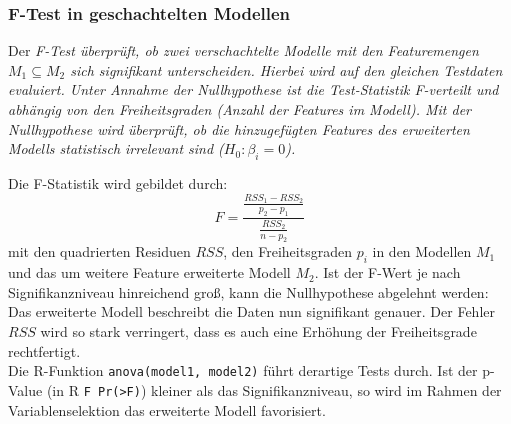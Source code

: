 \subsubsection{F-Test in geschachtelten Modellen}
Der \it{F-Test} überprüft, ob zwei verschachtelte Modelle mit den Featuremengen $M_1 \subseteq M_2$ sich signifikant unterscheiden.
Hierbei wird auf den gleichen Testdaten evaluiert.
Unter Annahme der Nullhypothese ist die Test-Statistik F-verteilt und abhängig von den Freiheitsgraden (Anzahl der Features im Modell).
Mit der Nullhypothese wird überprüft, ob die hinzugefügten Features des erweiterten Modells statistisch irrelevant sind ($H_0: \beta_i = 0$).

Die F-Statistik wird gebildet durch:
\begin{equation}
	F=\frac{\frac{RSS_1-RSS_2}{p_2-p_1}}{\frac{RSS_2}{n-p_2}}
\end{equation}
mit den quadrierten Residuen $RSS$, den Freiheitsgraden $p_i$ in den Modellen $M_1$ und das um weitere Feature erweiterte Modell $M_2$.
Ist der F-Wert je nach Signifikanzniveau hinreichend groß, kann die Nullhypothese abgelehnt werden:
Das erweiterte Modell beschreibt die Daten nun signifikant genauer.
Der Fehler $RSS$ wird so stark verringert, dass es auch eine Erhöhung der Freiheitsgrade rechtfertigt. 
\\
Die R-Funktion \lstinline|anova(model1, model2)| führt derartige Tests durch. Ist der p-Value (in R \lstinline|F Pr(>F)|) kleiner als das Signifikanzniveau, so wird im Rahmen der Variablenselektion das erweiterte Modell favorisiert.
